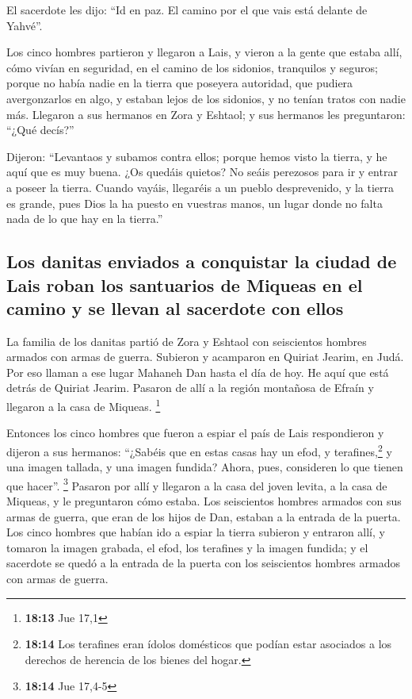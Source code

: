 El sacerdote les dijo: ``Id en paz. El camino por el que
vais está delante de Yahvé''.

 Los cinco hombres partieron y llegaron a Lais, y vieron a
la gente que estaba allí, cómo vivían en seguridad, en el camino de los
sidonios, tranquilos y seguros; porque no había nadie en la tierra que
poseyera autoridad, que pudiera avergonzarlos en algo, y estaban lejos
de los sidonios, y no tenían tratos con nadie más. 
Llegaron a sus hermanos en Zora y Eshtaol; y sus hermanos les
preguntaron: ``¿Qué decís?''

 Dijeron: ``Levantaos y subamos contra ellos; porque hemos
visto la tierra, y he aquí que es muy buena. ¿Os quedáis quietos? No
seáis perezosos para ir y entrar a poseer la tierra. 
Cuando vayáis, llegaréis a un pueblo desprevenido, y la tierra es
grande, pues Dios la ha puesto en vuestras manos, un lugar donde no
falta nada de lo que hay en la tierra.''

\hypertarget{los-danitas-enviados-a-conquistar-la-ciudad-de-lais-roban-los-santuarios-de-miqueas-en-el-camino-y-se-llevan-al-sacerdote-con-ellos}{%
\subsection{Los danitas enviados a conquistar la ciudad de Lais roban
los santuarios de Miqueas en el camino y se llevan al sacerdote con
ellos}\label{los-danitas-enviados-a-conquistar-la-ciudad-de-lais-roban-los-santuarios-de-miqueas-en-el-camino-y-se-llevan-al-sacerdote-con-ellos}}

 La familia de los danitas partió de Zora y Eshtaol con
seiscientos hombres armados con armas de guerra. 
Subieron y acamparon en Quiriat Jearim, en Judá. Por eso llaman a ese
lugar Mahaneh Dan hasta el día de hoy. He aquí que está detrás de
Quiriat Jearim.  Pasaron de allí a la región montañosa de
Efraín y llegaron a la casa de Miqueas. \footnote{\textbf{18:13} Jue
  17,1}

 Entonces los cinco hombres que fueron a espiar el país
de Lais respondieron y dijeron a sus hermanos: ``¿Sabéis que en estas
casas hay un efod, y terafines,\footnote{\textbf{18:14} Los terafines
  eran ídolos domésticos que podían estar asociados a los derechos de
  herencia de los bienes del hogar.} y una imagen tallada, y una imagen
fundida? Ahora, pues, consideren lo que tienen que hacer''. \footnote{\textbf{18:14}
  Jue 17,4-5}  Pasaron por allí y llegaron a la casa del
joven levita, a la casa de Miqueas, y le preguntaron cómo estaba.
 Los seiscientos hombres armados con sus armas de guerra,
que eran de los hijos de Dan, estaban a la entrada de la puerta.
 Los cinco hombres que habían ido a espiar la tierra
subieron y entraron allí, y tomaron la imagen grabada, el efod, los
terafines y la imagen fundida; y el sacerdote se quedó a la entrada de
la puerta con los seiscientos hombres armados con armas de guerra.

